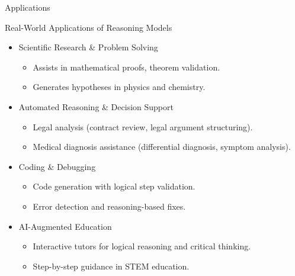 \begin{frame}[fragile]{ Applications}

Real-World Applications of Reasoning Models

    \begin{itemize}
        \item   Scientific Research \& Problem Solving
		    \begin{itemize}
			\item   Assists in mathematical proofs, theorem validation.
			\item   Generates hypotheses in physics and chemistry.
			\end{itemize}
        \item   Automated Reasoning \& Decision Support
		    \begin{itemize}
			\item   Legal analysis (contract review, legal argument structuring).
			\item   Medical diagnosis assistance (differential diagnosis, symptom analysis).
			\end{itemize}			
        \item   Coding \& Debugging
		    \begin{itemize}
			\item   Code generation with logical step validation.
			\item   Error detection and reasoning-based fixes.
			\end{itemize}			
        \item   AI-Augmented Education
		    \begin{itemize}
			\item   Interactive tutors for logical reasoning and critical thinking.
			\item   Step-by-step guidance in STEM education.
			\end{itemize}			
    \end{itemize}
\end{frame}

